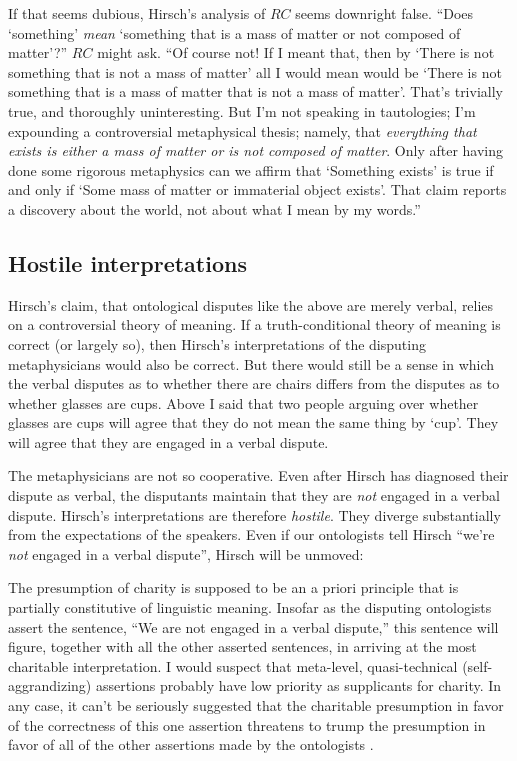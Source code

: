 \documentclass[11pt]{article}
\newenvironment{squote}{%
\begin{spacing}{1}
       	\begin{list}{}{%
\setlength{\labelwidth}{0pt}%
\rightmargin\leftmargin%
}
\item\relax
}{%
\end{list}%
\end{spacing}
}
\begin{document}
\begin{spacing}{1.25}
If that seems dubious, Hirsch's analysis of $RC$ seems downright
false.  ``Does `something' {\em mean} `something that is a mass of
matter or not composed of matter'?''  $RC$ might ask.  ``Of course
not!  If I meant that, then by `There is not something that is not a
mass of matter' all I would mean would be `There is not something that
is a mass of matter that is not a mass of matter'.  That's trivially
true, and thoroughly uninteresting.  But I'm not speaking in
tautologies; I'm expounding a controversial metaphysical thesis;
namely, that {\em everything that exists is either a mass of matter or
  is not composed of matter}.  Only after having done some rigorous
metaphysics can we affirm that `Something exists' is true if and only
if `Some mass of matter or immaterial object exists'.  That claim
reports a discovery about the world, not about what I mean by my
words.''

\subsection{Hostile interpretations}
\label{hostile}
Hirsch's claim, that ontological disputes like the above are merely
verbal, relies on a controversial theory of meaning.  If a
truth-conditional theory of meaning is correct (or largely so), then
Hirsch's interpretations of the disputing metaphysicians would also be
correct.  But there would still be a sense in which the verbal
disputes as to whether there are chairs differs from the disputes as
to whether glasses are cups.  Above I said that two people arguing
over whether glasses are cups will agree that they do not mean the
same thing by `cup'.  They will agree that they are engaged in a
verbal dispute.

The metaphysicians are not so cooperative.  Even after Hirsch has
diagnosed their dispute as verbal, the disputants maintain that they
are {\em not} engaged in a verbal dispute.  Hirsch's interpretations
are therefore \emph{hostile}.  They diverge substantially from the
expectations of the speakers.  Even if our ontologists tell Hirsch
``we're \emph{not} engaged in a verbal dispute'', Hirsch will be
unmoved:

\begin{squote}
The presumption of charity is supposed to be an a priori principle
that is partially constitutive of linguistic meaning.  Insofar as the
disputing ontologists assert the sentence, ``We are not engaged in a
verbal dispute,'' this sentence will figure, together with all the
other asserted sentences, in arriving at the most charitable
interpretation.  I would suspect that meta-level, quasi-technical
(self-aggrandizing) assertions probably have low priority as
supplicants for charity.  In any case, it can't be seriously suggested
that the charitable presumption in favor of the correctness of this
one assertion threatens to trump the presumption in favor of all of
the other assertions made by the ontologists
\citeyearpar[515]{hirsch2008}.
\end{squote}


\end{spacing}
\end{document}
